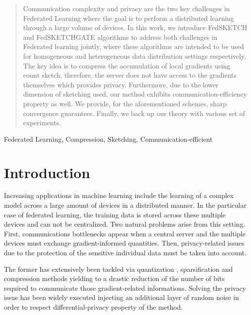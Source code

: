 \documentclass[review,onefignum,onetabnum]{siamart190516}
\begin{document}
\maketitle

\begin{abstract}
Communication complexity and privacy are the two key challenges in Federated Learning where the goal is to perform a distributed learning through a large volume of devices. In this work, we introduce FedSKETCH and FedSKETCHGATE algorithms to address both challenges in Federated learning jointly, where these algorithms are intended to be used for homogeneous and heterogeneous data distribution settings respectively. The key idea is to compress the accumulation of local gradients using count sketch, therefore, the server does not have access to the gradients themselves which provides privacy. Furthermore, due to the lower dimension of sketching used, our method exhibits communication-efficiency property as well. 
We provide, for the aforementioned schemes, sharp convergence guarantees. Finally, we back up our theory with various set of experiments.
\end{abstract}

\begin{keywords}
Federated Learning, Compression, Sketching, Communication-efficient
\end{keywords}


\section{Introduction}
Increasing applications in machine learning include the learning of a complex model across a large amount of devices in a distributed manner.
In the particular case of federated learning, the training data is stored across these multiple devices and can not be centralized.
Two natural problems arise from this setting. 
First, communications bottlenecks appear when a central server and the multiple devices must exchange gradient-informed quantities.
Then, privacy-related issues due to the protection of the sensitive individual data must be taken into account.

The former has extensively been tackled via quantization \cite{alistarh2017qsgd}, sparsification \cite{wangni2018gradient} and compression \cite{bernstein2018signsgd} methods yielding to a drastic reduction of the number of bits required to communicate those gradient-related informations.
Solving the privacy issue has been widely executed injecting an additional layer of random noise in order to respect differential-privacy property of the method.
\end{document}
